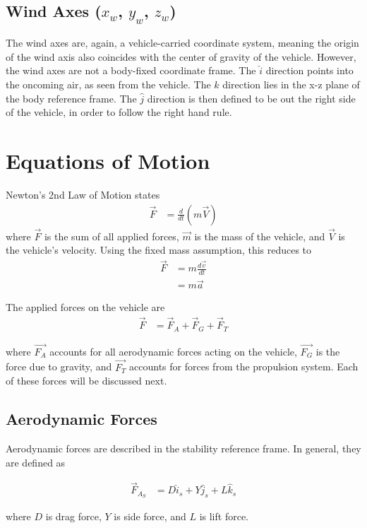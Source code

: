 \subsection*{Wind Axes ($x_w$, $y_w$, $z_w$)}
The wind axes are, again, a vehicle-carried coordinate system, meaning the origin of the wind axis also coincides with the center of gravity of the vehicle. However, the wind axes are not a body-fixed coordinate frame. The $\hat{i}$ direction points into the oncoming air, as seen from the vehicle. The $\hat{k}$ direction lies in the x-z plane of the body reference frame. The $\hat{j}$ direction is then defined to be out the right side of the vehicle, in order to follow the right hand rule. 

\section{Equations of Motion}
\label{sys-desc}
Newton's 2nd Law of Motion states
\begin{align}
\vec{F} &= \frac{d}{dt}(m\vec{V})
\end{align}
where $\vec{F}$ is the sum of all applied forces, $\vec{m}$ is the mass of the vehicle, and $\vec{V}$ is the vehicle's velocity. Using the fixed mass assumption, this reduces to 
\begin{align}
\vec{F} &= m\frac{d\vec{v}}{dt}\\
&= m\vec{a}
\end{align}

The applied forces on the vehicle are 
\begin{align}
\vec{F} &= \vec{F}_{A}+\vec{F}_{G}+\vec{F}_{T}
\end{align}

where $\vec{F_{A}}$ accounts for all aerodynamic forces acting on the vehicle, $\vec{F_{G}}$ is the force due to gravity, and $\vec{F_{T}}$ accounts for forces from the propulsion system. Each of these forces will be discussed next.

\subsection*{Aerodynamic Forces}
Aerodynamic forces are described in the stability reference frame. In general, they are defined as

\begin{align}
\vec{F}_{A_S} &= D \hat{i}_s+Y \hat{j}_s+L \hat{k}_s
\end{align}

where $D$ is drag force, $Y$ is side force, and $L$ is lift force. 

